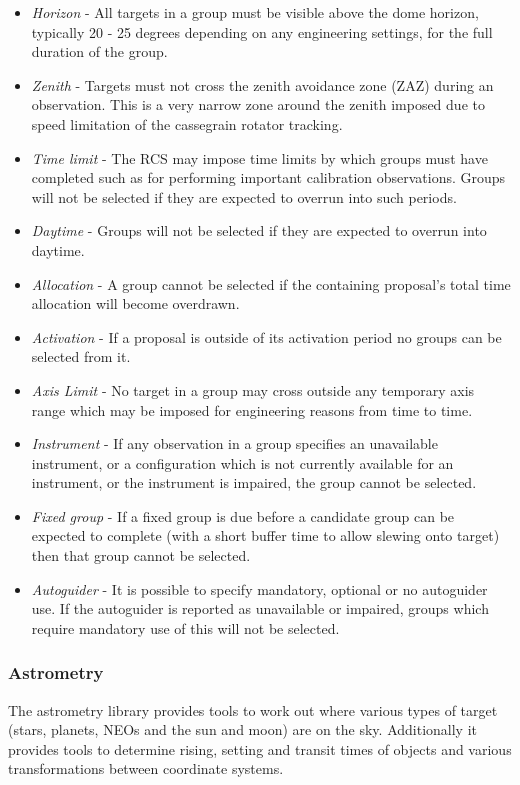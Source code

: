 \begin{itemize}
    \item \emph{Horizon} - All targets in a group must be visible above the dome horizon, typically 20 - 25 degrees depending on any engineering settings, for the full duration of the group.
    \item \emph{Zenith} - Targets must not cross the zenith avoidance zone (ZAZ) during an observation. This is a very narrow zone around the zenith imposed due to speed limitation of the cassegrain rotator tracking.
    \item \emph{Time limit} - The RCS may impose time limits by which groups must have completed such as for performing important calibration observations. Groups will not be selected if they are expected to overrun into such periods.
    \item \emph{Daytime} - Groups will not be selected if they are expected to overrun into daytime.
    \item \emph{Allocation} - A group cannot be selected if the containing proposal's total time allocation will become overdrawn.
    \item \emph{Activation} - If a proposal is outside of its activation period no groups can be selected from it.
    \item \emph{Axis Limit} - No target in a group may cross outside any temporary axis range which may be imposed for engineering reasons from time to time.
    \item \emph{Instrument} - If any observation in a group specifies an unavailable instrument, or a configuration which is not currently available for an instrument, or the instrument is impaired, the group cannot be selected.
    \item \emph{Fixed group} - If a fixed group is due before a candidate group can be expected to complete (with a short buffer time to allow slewing onto target) then that group cannot be selected.
    \item \emph{Autoguider} - It is possible to specify mandatory, optional or no autoguider use. If the autoguider is reported as unavailable or impaired, groups which require mandatory use of this will not be selected.

\end{itemize}


\subsubsection{Astrometry}
The astrometry library provides tools to work out where various types of target (stars, planets, NEOs and the sun and moon) are on the sky. Additionally it provides tools to determine rising, setting and transit times of objects and various transformations between coordinate systems.

